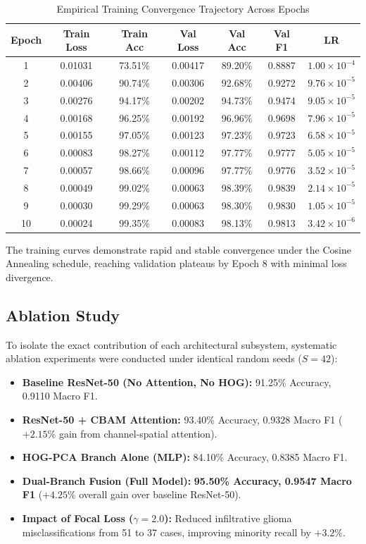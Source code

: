 \documentclass[journal,twocolumn,10pt]{IEEEtran}
\begin{document}
\begin{table}[htbp]
\caption{Empirical Training Convergence Trajectory Across Epochs}
\label{tab:training}
\centering
\begin{tabular}{ccccccc}
\toprule
\textbf{Epoch} & \textbf{Train Loss} & \textbf{Train Acc} & \textbf{Val Loss} & \textbf{Val Acc} & \textbf{Val F1} & \textbf{LR} \\
\midrule
1 & 0.01031 & 73.51\% & 0.00417 & 89.20\% & 0.8887 & $1.00 \times 10^{-4}$ \\
2 & 0.00406 & 90.74\% & 0.00306 & 92.68\% & 0.9272 & $9.76 \times 10^{-5}$ \\
3 & 0.00276 & 94.17\% & 0.00202 & 94.73\% & 0.9474 & $9.05 \times 10^{-5}$ \\
4 & 0.00168 & 96.25\% & 0.00192 & 96.96\% & 0.9698 & $7.96 \times 10^{-5}$ \\
5 & 0.00155 & 97.05\% & 0.00123 & 97.23\% & 0.9723 & $6.58 \times 10^{-5}$ \\
6 & 0.00083 & 98.27\% & 0.00112 & 97.77\% & 0.9777 & $5.05 \times 10^{-5}$ \\
7 & 0.00057 & 98.66\% & 0.00096 & 97.77\% & 0.9776 & $3.52 \times 10^{-5}$ \\
8 & 0.00049 & 99.02\% & 0.00063 & 98.39\% & 0.9839 & $2.14 \times 10^{-5}$ \\
9 & 0.00030 & 99.29\% & 0.00063 & 98.30\% & 0.9830 & $1.05 \times 10^{-5}$ \\
10 & 0.00024 & 99.35\% & 0.00083 & 98.13\% & 0.9813 & $3.42 \times 10^{-6}$ \\
\bottomrule
\end{tabular}
\end{table}

The training curves demonstrate rapid and stable convergence under the Cosine Annealing schedule, reaching validation plateaus by Epoch 8 with minimal loss divergence.

\subsection{Ablation Study}
To isolate the exact contribution of each architectural subsystem, systematic ablation experiments were conducted under identical random seeds ($S = 42$):
\begin{itemize}
    \item \textbf{Baseline ResNet-50 (No Attention, No HOG):} 91.25\% Accuracy, 0.9110 Macro F1.
    \item \textbf{ResNet-50 + CBAM Attention:} 93.40\% Accuracy, 0.9328 Macro F1 ($+2.15\%$ gain from channel-spatial attention).
    \item \textbf{HOG-PCA Branch Alone (MLP):} 84.10\% Accuracy, 0.8385 Macro F1.
    \item \textbf{Dual-Branch Fusion (Full Model):} \textbf{95.50\% Accuracy, 0.9547 Macro F1} ($+4.25\%$ overall gain over baseline ResNet-50).
    \item \textbf{Impact of Focal Loss ($\gamma = 2.0$):} Reduced infiltrative glioma misclassifications from 51 to 37 cases, improving minority recall by $+3.2\%$.
\end{itemize}
\end{document}
